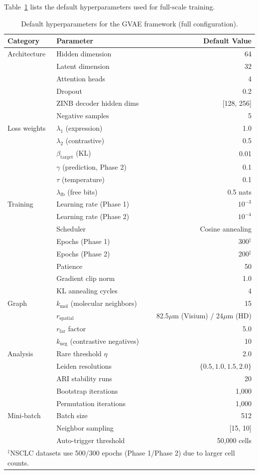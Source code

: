 \documentclass{article}
\begin{document}
Table~\ref{tab:defaults} lists the default hyperparameters used for full-scale training.

\begin{table}[H]
\centering
\caption{Default hyperparameters for the GVAE framework (full configuration).}
\label{tab:defaults}
\begin{tabular}{llr}
\toprule
Category & Parameter & Default Value \\
\midrule
Architecture & Hidden dimension & 64 \\
& Latent dimension & 32 \\
& Attention heads & 4 \\
& Dropout & 0.2 \\
& ZINB decoder hidden dims & [128, 256] \\
& Negative samples & 5 \\
\midrule
Loss weights & $\lambda_1$ (expression) & 1.0 \\
& $\lambda_2$ (contrastive) & 0.5 \\
& $\beta_{\text{target}}$ (KL) & 0.01 \\
& $\gamma$ (prediction, Phase 2) & 0.1 \\
& $\tau$ (temperature) & 0.1 \\
& $\lambda_{\text{fb}}$ (free bits) & 0.5 nats \\
\midrule
Training & Learning rate (Phase 1) & $10^{-3}$ \\
& Learning rate (Phase 2) & $10^{-4}$ \\
& Scheduler & Cosine annealing \\
& Epochs (Phase 1) & 300$^\ddagger$ \\
& Epochs (Phase 2) & 200$^\ddagger$ \\
& Patience & 50 \\
& Gradient clip norm & 1.0 \\
& KL annealing cycles & 4 \\
\midrule
Graph & $k_{\text{mol}}$ (molecular neighbors) & 15 \\
& $r_{\text{spatial}}$ & 82.5$\mu$m (Visium) / 24$\mu$m (HD) \\
& $r_{\text{far}}$ factor & 5.0 \\
& $k_{\text{neg}}$ (contrastive negatives) & 10 \\
\midrule
Analysis & Rare threshold $\eta$ & 2.0 \\
& Leiden resolutions & $\{0.5, 1.0, 1.5, 2.0\}$ \\
& ARI stability runs & 20 \\
& Bootstrap iterations & 1,000 \\
& Permutation iterations & 1,000 \\
\midrule
Mini-batch & Batch size & 512 \\
& Neighbor sampling & [15, 10] \\
& Auto-trigger threshold & 50,000 cells \\
\bottomrule
\multicolumn{3}{l}{\footnotesize $^\ddagger$NSCLC datasets use 500/300 epochs (Phase 1/Phase 2) due to larger cell counts.}
\end{tabular}
\end{table}
\end{document}
